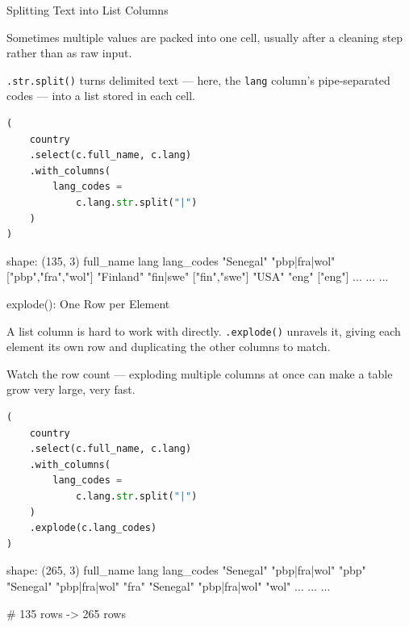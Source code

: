 \documentclass[8pt,aspectratio=169]{beamer}
\begin{document}
\begin{frame}[fragile]{Splitting Text into List Columns}
\begin{splitcode}{%

Sometimes multiple values are packed into one cell, usually after a cleaning step rather than as raw input.

\texttt{.str.split()} turns delimited text --- here, the \texttt{lang} column's pipe-separated codes --- into a list stored in each cell.

}
\begin{lstlisting}[language=Python]
(
    country
    .select(c.full_name, c.lang)
    .with_columns(
        lang_codes =
            c.lang.str.split("|")
    )
)
\end{lstlisting}
\begin{codeoutput}
shape: (135, 3)
full_name    lang          lang_codes
"Senegal"    "pbp|fra|wol" ["pbp","fra","wol"]
"Finland"    "fin|swe"     ["fin","swe"]
"USA"        "eng"         ["eng"]
...          ...           ...
\end{codeoutput}
\end{splitcode}
\end{frame}

\begin{frame}[fragile]{explode(): One Row per Element}
\begin{splitcode}{%

A list column is hard to work with directly. \texttt{.explode()} unravels it, giving each element its own row and duplicating the other columns to match.

Watch the row count --- exploding multiple columns at once can make a table grow very large, very fast.

}
\begin{lstlisting}[language=Python]
(
    country
    .select(c.full_name, c.lang)
    .with_columns(
        lang_codes =
            c.lang.str.split("|")
    )
    .explode(c.lang_codes)
)
\end{lstlisting}
\begin{codeoutput}
shape: (265, 3)
full_name    lang           lang_codes
"Senegal"    "pbp|fra|wol"  "pbp"
"Senegal"    "pbp|fra|wol"  "fra"
"Senegal"    "pbp|fra|wol"  "wol"
...          ...            ...

# 135 rows -> 265 rows
\end{codeoutput}
\end{splitcode}
\end{frame}
\end{document}

